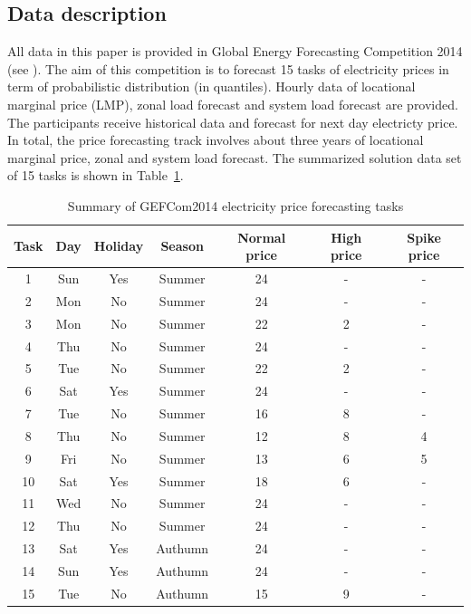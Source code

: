 \documentclass[review]{elsarticle}
\begin{document}
    \subsection{Data description}
      All data in this paper is provided in Global Energy Forecasting Competition 2014 (see \cite{Hong2016}).
      The aim of this competition is to forecast 15 tasks of electricity prices in term of probabilistic distribution (in quantiles).
      Hourly data of locational marginal price (LMP), zonal load forecast and system load forecast are provided.
      The participants receive historical data and forecast for next day electricty price.
      In total, the price forecasting track involves about three years of locational marginal price, zonal and system load forecast.
      The summarized solution data set of 15 tasks is shown in Table~\ref{table:price_data_set}.
      \begin{table}[H]
        \begin{center}
        \caption{Summary of GEFCom2014 electricity price forecasting tasks}
        \begin{adjustbox}{width=\textwidth}
          \begin{tabular}{|c|c|c|c|c|c|c|}
            \hline
            Task & Day & Holiday & Season & Normal price & High price & Spike price\\
            \hline
            1 & Sun & Yes & Summer & 24 & - & -\\
            2 & Mon & No & Summer & 24 & - & -\\
            3 & Mon & No & Summer & 22 & 2 & -\\
            4 & Thu & No & Summer & 24 & - & -\\
            5 & Tue & No & Summer & 22 & 2 & -\\
            6 & Sat & Yes & Summer & 24 & - & -\\
            7 & Tue & No & Summer & 16 & 8 & -\\
            8 & Thu & No & Summer & 12 & 8 & 4\\
            9 & Fri & No & Summer & 13 & 6 & 5\\
            10 & Sat & Yes & Summer & 18 & 6 & -\\
            11 & Wed & No & Summer & 24 & - & -\\
            12 & Thu & No & Summer & 24 & - & -\\
            13 & Sat & Yes & Authumn & 24 & - & -\\
            14 & Sun & Yes & Authumn & 24 & - & -\\
            15 & Tue & No & Authumn & 15 & 9 & -\\
            \hline
          \end{tabular}
        \end{adjustbox}
        \label{table:price_data_set}
        \end{center}
      \end{table}
\end{document}
